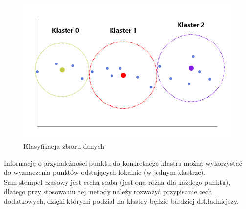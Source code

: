 \documentclass[eng,printmode]{mgr}
\begin{document}
\begin{figure}[H]
  \begin{center}
  \includegraphics[scale=0.7]{KMean}
  \end{center}
  \caption{Klasyfikacja zbioru danych}
  \label{fig:KMean}
\end{figure}

Informację o przynależności punktu do konkretnego klastra można wykorzystać do wyznaczenia punktów odstających lokalnie (w jednym klastrze). \\
Sam stempel czasowy jest cechą słabą (jest ona różna dla każdego punktu), dlatego przy stosowaniu tej metody należy rozważyć przypisanie cech dodatkowych, dzięki którymi podział na klastry będzie bardziej dokładniejszy.
\end{document}
